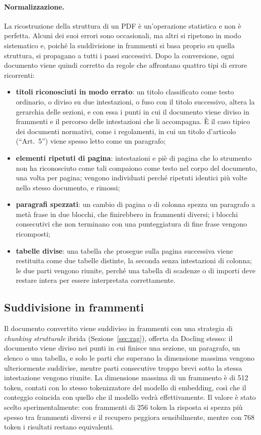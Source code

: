 \paragraph{Normalizzazione.} La ricostruzione della struttura di un PDF è un'operazione statistica e non è
perfetta. Alcuni dei suoi errori sono occasionali, ma altri si ripetono in modo sistematico e, poiché la
suddivisione in frammenti si basa proprio su quella struttura, si propagano a tutti i passi successivi. Dopo la
conversione, ogni documento viene quindi corretto da regole che affrontano quattro tipi di errore ricorrenti:
\begin{itemize}
  \item \textbf{titoli riconosciuti in modo errato}: un titolo classificato come testo ordinario, o diviso su due
  intestazioni, o fuso con il titolo successivo, altera la gerarchia delle sezioni, e con essa i punti in cui il
  documento viene diviso in frammenti e il percorso delle intestazioni che li accompagna. È il caso tipico dei documenti normativi, come i
  regolamenti, in cui un titolo d'articolo (``Art.~5'') viene spesso letto come un paragrafo;
  \item \textbf{elementi ripetuti di pagina}: intestazioni e piè di pagina che lo strumento non ha riconosciuto come
  tali compaiono come testo nel corpo del documento, una volta per pagina; vengono individuati perché ripetuti
  identici più volte nello stesso documento, e rimossi;
  \item \textbf{paragrafi spezzati}: un cambio di pagina o di colonna spezza un paragrafo a metà frase in due
  blocchi, che finirebbero in frammenti diversi; i blocchi consecutivi che non terminano con una punteggiatura di
  fine frase vengono ricomposti;
  \item \textbf{tabelle divise}: una tabella che prosegue sulla pagina successiva viene restituita come due tabelle
  distinte, la seconda senza intestazioni di colonna; le due parti vengono riunite, perché una tabella di scadenze o
  di importi deve restare intera per essere interpretata correttamente.
\end{itemize}

\subsection{Suddivisione in frammenti}\label{sec:chunking}

Il documento convertito viene suddiviso in frammenti con una strategia di \emph{chunking strutturale} ibrida
(Sezione~\ref{sec:rag}), offerta da Docling stesso: il documento viene diviso nei punti in cui finisce una
sezione, un paragrafo, un elenco o una tabella, e solo le parti che superano la dimensione massima vengono
ulteriormente suddivise, mentre parti consecutive troppo brevi sotto la stessa intestazione vengono riunite. La dimensione massima
di un frammento è di 512 token, contati con lo stesso tokenizzatore del modello di embedding, così che il conteggio
coincida con quello che il modello vedrà effettivamente. Il valore è stato scelto sperimentalmente: con frammenti
di 256 token la risposta si spezza più spesso tra frammenti diversi e il recupero peggiora sensibilmente, mentre
con 768 token i risultati restano equivalenti.

